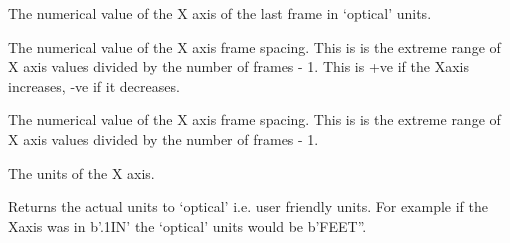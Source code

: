 \documentclass[letterpaper,10pt,english]{sphinxmanual}
\begin{document}
\begin{fulllineitems}
\begin{fulllineitems}
\end{fulllineitems}


\begin{fulllineitems}
\label{\detokenize{ref/LIS/core/LogPass:TotalDepth.LIS.core.LogPass.LogPass.xAxisLastValOptical}}
The numerical value of the X axis of the last frame in ‘optical’ units.

\end{fulllineitems}


\begin{fulllineitems}
\label{\detokenize{ref/LIS/core/LogPass:TotalDepth.LIS.core.LogPass.LogPass.xAxisSpacing}}
The numerical value of the X axis frame spacing. This is is the
extreme range of X axis values divided by the number of frames - 1.
This is +ve if the Xaxis increases, -ve if it decreases.

\end{fulllineitems}


\begin{fulllineitems}
\label{\detokenize{ref/LIS/core/LogPass:TotalDepth.LIS.core.LogPass.LogPass.xAxisSpacingOptical}}
The numerical value of the X axis frame spacing. This is is the
extreme range of X axis values divided by the number of frames - 1.

\end{fulllineitems}


\begin{fulllineitems}
\label{\detokenize{ref/LIS/core/LogPass:TotalDepth.LIS.core.LogPass.LogPass.xAxisUnits}}
The units of the X axis.

\end{fulllineitems}


\begin{fulllineitems}
\label{\detokenize{ref/LIS/core/LogPass:TotalDepth.LIS.core.LogPass.LogPass.xAxisUnitsOptical}}
Returns the actual units to ‘optical’ i.e. user friendly units.
For example if the Xaxis was in b’.1IN’ the ‘optical’ units would be b’FEET”.

\end{fulllineitems}


\end{fulllineitems}
\end{document}
